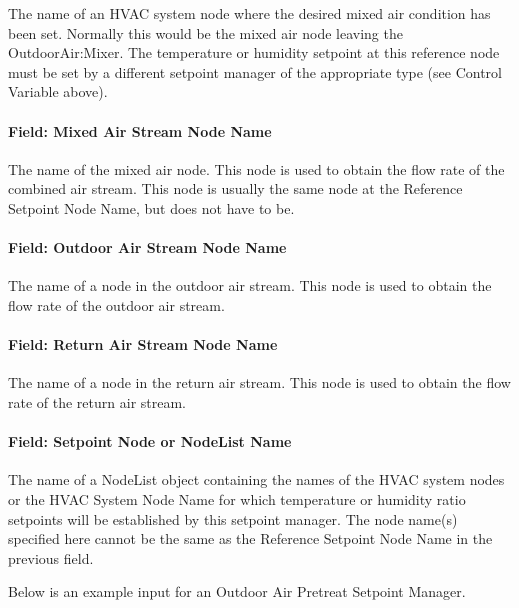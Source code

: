 The name of an HVAC system node where the desired mixed air condition has been set. Normally this would be the mixed air node leaving the OutdoorAir:Mixer. The temperature or humidity setpoint at this reference node must be set by a different setpoint manager of the appropriate type (see Control Variable above).

\paragraph{Field: Mixed Air Stream Node Name}\label{field-mixed-air-stream-node-name}

The name of the mixed air node. This node is used to obtain the flow rate of the combined air stream. This node is usually the same node at the Reference Setpoint Node Name, but does not have to be.

\paragraph{Field: Outdoor Air Stream Node Name}\label{field-outdoor-air-stream-node-name-000}

The name of a node in the outdoor air stream. This node is used to obtain the flow rate of the outdoor air stream.

\paragraph{Field: Return Air Stream Node Name}\label{field-return-air-stream-node-name-000}

The name of a node in the return air stream. This node is used to obtain the flow rate of the return air stream.

\paragraph{Field: Setpoint Node or NodeList Name}\label{field-setpoint-node-or-nodelist-name-9}

The name of a NodeList object containing the names of the HVAC system nodes or the HVAC System Node Name for which temperature or humidity ratio setpoints will be established by this setpoint manager. The node name(s) specified here cannot be the same as the Reference Setpoint Node Name in the previous field.


Below is an example input for an Outdoor Air Pretreat Setpoint Manager.

